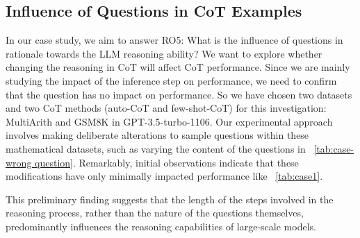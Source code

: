 \documentclass[11pt]{article}
\begin{document}

\subsection{Influence of Questions in CoT Examples}
\label{section4.6}

In our case study, we aim to answer RO5: What is the influence of questions in rationale towards the LLM reasoning ability? We want to explore whether changing the reasoning in CoT will affect CoT performance. Since we are mainly studying the impact of the inference step on performance, we need to confirm that the question has no impact on performance. So we have chosen two datasets and two CoT methods (auto-CoT and few-shot-CoT) for this investigation: MultiArith \cite{roy2015solving} and GSM8K \cite{cobbe2021training} in GPT-3.5-turbo-1106. Our experimental approach involves making deliberate alterations to sample questions within these mathematical datasets, such as varying the content of the questions in ~\autoref{tab:case-wrong question}. Remarkably, initial observations indicate that these modifications have only minimally impacted performance like ~\autoref{tab:case1}. 


This preliminary finding suggests that the length of the steps involved in the reasoning process, rather than the nature of the questions themselves, predominantly influences the reasoning capabilities of large-scale models. 
\end{document}
